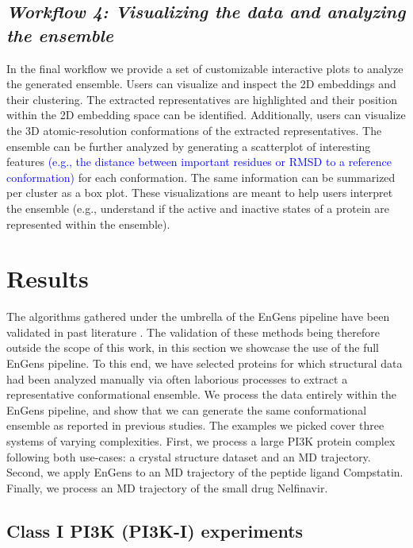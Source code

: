 \documentclass[unnumsec,webpdf,contemporary,large,numsquare]{oup-authoring-template}%
\theoremstyle{thmstyleone}%
\theoremstyle{thmstyletwo}%
\theoremstyle{thmstylethree}%
\begin{document}
\subsection{\textit{\textbf{Workflow 4:} Visualizing the data and analyzing the ensemble}}\label{wf1}

In the final workflow we provide a set of customizable interactive plots to analyze the generated ensemble. Users can visualize and inspect the 2D embeddings and their clustering. The extracted representatives are highlighted and their position within the 2D embedding space can be identified. Additionally, users can visualize the 3D atomic-resolution conformations of the extracted representatives. The ensemble can be further analyzed by generating a scatterplot of interesting features \textcolor{blue}{(e.g., the distance between important residues or RMSD to a reference conformation)} for each conformation. The same information can be summarized per cluster as a box plot. These visualizations are meant to help users interpret the ensemble (e.g., understand if the active and inactive states of a protein are represented within the ensemble).


\section{Results}

The algorithms gathered under the umbrella of the EnGens pipeline have been validated in past literature \citep{scherer_pyemma_2015, chen_nonlinear_2019, trozzi_umap_2021, perez-hernandez_identification_2013, schwantes_modeling_2015}. The validation of these methods being therefore outside the scope of this work, in this section we showcase the use of the full EnGens pipeline. To this end, we have selected proteins for which structural data had been analyzed manually via often laborious processes to extract a representative conformational ensemble. We process the data entirely within the EnGens pipeline, and show that we can generate the same conformational ensemble as reported in previous studies. The examples we picked cover three systems of varying complexities. First, we process a large PI3K protein complex following both use-cases: a crystal structure dataset and an MD trajectory. Second, we apply EnGens to an MD trajectory of the peptide ligand Compstatin. Finally, we process an MD trajectory of the small drug Nelfinavir.


\subsection{Class I PI3K (PI3K-I) experiments}
\end{document}
